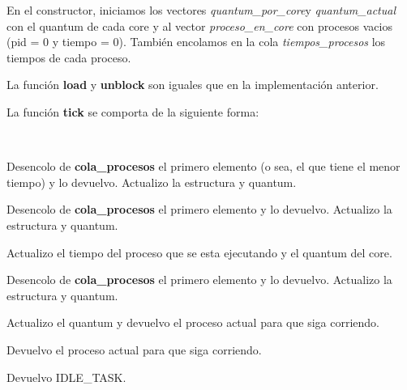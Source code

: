 En el constructor, iniciamos los vectores \emph{quantum\_por\_core}y \emph{quantum\_actual} con el quantum de cada core y al vector \emph{proceso\_en\_core} con procesos vacios (pid = 0 y tiempo = 0). También encolamos en la cola \emph{tiempos\_procesos} los tiempos de cada proceso.

La función \textbf{load} y \textbf{unblock} son iguales que en la implementación anterior.

La función \textbf{tick} se comporta de la siguiente forma:

~

\begin{algorithmic}

		\State Desencolo de \textbf{cola\_procesos} el primero elemento (o sea, el que tiene el menor tiempo) y lo devuelvo.
		\State Actualizo la estructura y quantum.
	
		\State Desencolo de \textbf{cola\_procesos} el primero elemento y lo devuelvo.
		\State Actualizo la estructura y quantum.

		\State Actualizo el tiempo del proceso que se esta ejecutando y el quantum del core.

			\State Desencolo de \textbf{cola\_procesos} el primero elemento y lo devuelvo.
			\State Actualizo la estructura y quantum.

			\State Actualizo el quantum y devuelvo el proceso actual para que siga corriendo.

		\Else
			\State Devuelvo el proceso actual para que siga corriendo.
		\EndIf

	\Else
		\State Devuelvo IDLE\_TASK.
	\EndIf
\EndFunction	
\end{algorithmic}